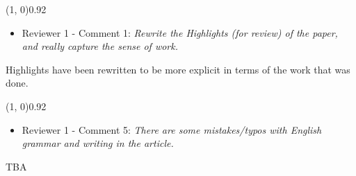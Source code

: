 \documentclass{article}
\begin{document}
    \line(1, 0){0.92\textwidth}
    \begin{itemize}
        \item Reviewer 1 - Comment 1: \textit{Rewrite the Highlights (for
        review) of the paper, and really capture the sense of work.}
    \end{itemize}
    Highlights have been rewritten to be more explicit in terms of the work
    that was done.

    \line(1, 0){0.92\textwidth}
    \begin{itemize}
        \item Reviewer 1 - Comment 5: \textit{There are some mistakes/typos
        with English grammar and writing in the article.}
    \end{itemize}
    TBA %
\end{document}
